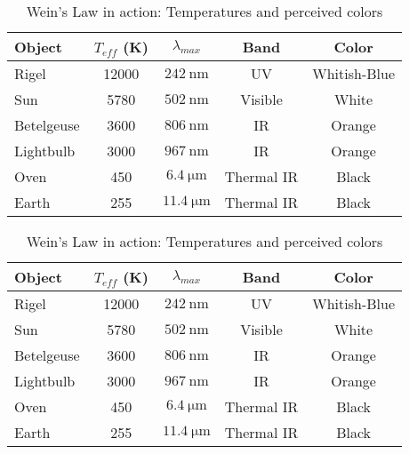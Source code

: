 \documentclass[amstex,12pt]{book}
\begin{document}
\begin{table}
\begin{center}
\caption{Wein's Law in action: Temperatures and perceived colors}
\label{tab:weins_results}
\begin{tabular}{@{}lcccc@{}} \toprule
Object & $T_{eff}$ (K) & $\lambda_{max}$ & Band & Color\\ \midrule
Rigel	&12000	& $\SI{242}{\nano\metre}$ 	& UV	& Whitish-Blue\\
Sun		&5780		& $\SI{502}{\nano\metre}$ 	& Visible	& White\\
Betelgeuse	&3600	& $\SI{806}{\nano\metre}$ 	& IR	& Orange\\
Lightbulb	&3000	& $\SI{967}{\nano\metre}$ 	& IR	& Orange\\
Oven	&450	& $\SI{6.4}{\micro\metre}$ 	& Thermal IR	& Black\\
Earth	&255	& $\SI{11.4}{\micro\metre}$ 	& Thermal IR	& Black\\ \bottomrule
\end{tabular}
\end{center}
\end{table}

\begin{table}
\centering
\caption{Wein's Law in action: Temperatures and perceived colors}
\label{tab:weins_results}

\begin{tabular}{@{}lcccc@{}} \toprule
Object & $T_{eff}$ (K) & $\lambda_{max}$ & Band & Color\\ \midrule
Rigel	&12000	& $\SI{242}{\nano\metre}$ 	& UV	& Whitish-Blue\\
Sun		&5780		& $\SI{502}{\nano\metre}$ 	& Visible	& White\\
Betelgeuse	&3600	& $\SI{806}{\nano\metre}$ 	& IR	& Orange\\
Lightbulb	&3000	& $\SI{967}{\nano\metre}$ 	& IR	& Orange\\
Oven	&450	& $\SI{6.4}{\micro\metre}$ 	& Thermal IR	& Black\\
Earth	&255	& $\SI{11.4}{\micro\metre}$ 	& Thermal IR	& Black\\ \bottomrule
\end{tabular}

\end{table}
\end{document}
